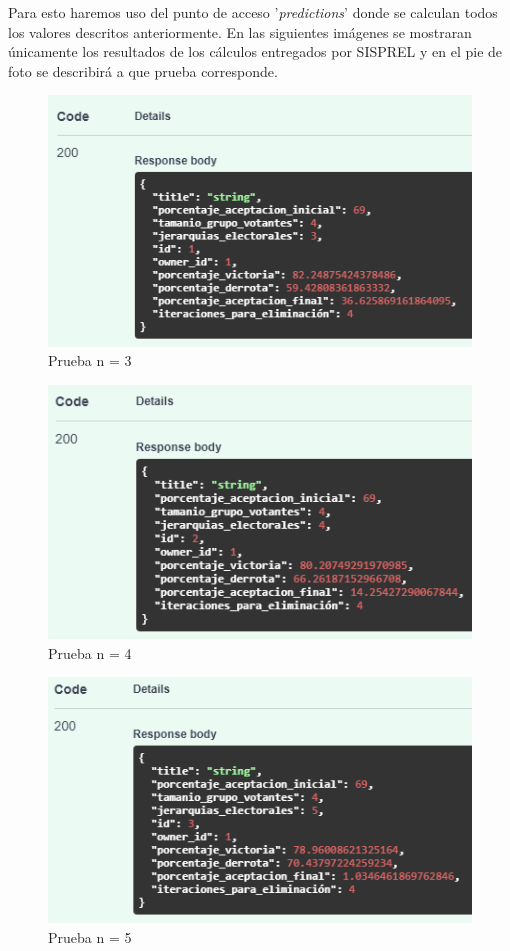 Para esto haremos uso del punto de acceso '\textit{predictions}' donde se calculan todos los valores descritos anteriormente. En las siguientes imágenes se mostraran únicamente los resultados de los cálculos entregados por SISPREL y en el pie de foto se describirá a que prueba corresponde.

\begin{figure}[!htb]
    \centering
    \includegraphics[scale=.9]{TT/img/pruebas/second_test_galam.png}
    \caption{Prueba n = 3}
    \label{graphic:second_test}
\end{figure}

\begin{figure}[!htb]
    \centering
    \includegraphics[scale=.9]{TT/img/pruebas/tercera_prueba_galam.png}
    \caption{Prueba n = 4}
    \label{graphic:tercer_test}
\end{figure}

\begin{figure}[!htb]
    \centering
    \includegraphics[scale=.9]{TT/img/pruebas/cuarta_prueba_galam.png}
    \caption{Prueba n = 5}
    \label{graphic:cuarto_test}
\end{figure}


